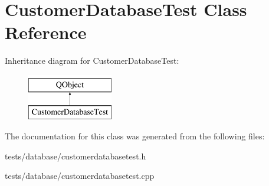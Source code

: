 \hypertarget{classCustomerDatabaseTest}{\section{Customer\+Database\+Test Class Reference}
\label{classCustomerDatabaseTest}
}
Inheritance diagram for Customer\+Database\+Test\+:\begin{figure}[H]
\begin{center}
\leavevmode
\includegraphics[height=2.000000cm]{d2/d63/classCustomerDatabaseTest}
\end{center}
\end{figure}


The documentation for this class was generated from the following files\+:\begin{DoxyCompactItemize}
\item 
tests/database/customerdatabasetest.\+h\item 
tests/database/customerdatabasetest.\+cpp\end{DoxyCompactItemize}
